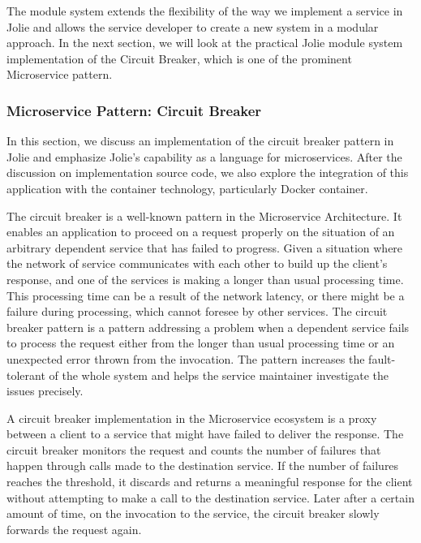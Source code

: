 The module system extends the flexibility of the way we implement a service in Jolie and allows the service developer to create a new system in a modular approach. In the next section, we will look at the practical Jolie module system implementation of the Circuit Breaker, which is one of the prominent  Microservice pattern. 

\subsubsection{Microservice Pattern: Circuit Breaker}
In this section, we discuss an implementation of the circuit breaker pattern in Jolie and emphasize Jolie's capability as a language for microservices. After the discussion on implementation source code, we also explore the integration of this application with the container technology, particularly Docker container.

The circuit breaker is a well-known pattern in the Microservice Architecture. It enables an application to proceed on a request properly on the situation of an arbitrary dependent service that has failed to progress. Given a situation where the network of service communicates with each other to build up the client's response, and one of the services is making a longer than usual processing time. This processing time can be a result of the network latency, or there might be a failure during processing, which cannot foresee by other services. The circuit breaker pattern is a pattern addressing a problem when a dependent service fails to process the request either from the longer than usual processing time or an unexpected error thrown from the invocation. The pattern increases the fault-tolerant of the whole system and helps the service maintainer investigate the issues precisely.

A circuit breaker implementation in the Microservice ecosystem is a proxy between a client to a service that might have failed to deliver the response. The circuit breaker monitors the request and counts the number of failures that happen through calls made to the destination service. If the number of failures reaches the threshold, it discards and returns a meaningful response for the client without attempting to make a call to the destination service. Later after a certain amount of time, on the invocation to the service, the circuit breaker slowly forwards the request again.


